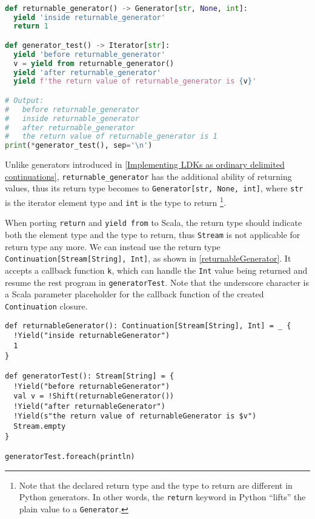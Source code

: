 \begin{lstlisting}[language=Python,style=Python3,caption={Use \lstinline{yield from} and \lstinline{return} in Python generators},label={returnable_generator}]

def returnable_generator() -> Generator[str, None, int]:
  yield 'inside returnable_generator'
  return 1

def generator_test() -> Iterator[str]:
  yield 'before returnable_generator'
  v = yield from returnable_generator()
  yield 'after returnable_generator'
  yield f'the return value of returnable_generator is {v}'

# Output:
#   before returnable_generator
#   inside returnable_generator
#   after returnable_generator
#   the return value of returnable_generator is 1
print(*generator_test(), sep='\n')
\end{lstlisting}

Unlike generators introduced in \cref{Implementing LDKs as ordinary delimited continuations}, \lstinline{returnable_generator} has the additional ability of returning values, thus its return type becomes to \lstinline{Generator[str, None, int]}, where \lstinline{str} is the iterator element type and \lstinline{int} is the type to return \footnote{Note that the declared return type and the type to return are different in Python generators. In other words, the \lstinline{return} keyword in Python ``lifts'' the plain value to a \lstinline{Generator}.}.

When porting \lstinline{return} and \lstinline{yield from} to Scala, the return type should indicate both the element type and the type to return, thus \lstinline{Stream} is not applicable for return type any more. We can instead use the return type \lstinline{Continuation[Stream[String], Int]}, as shown in \cref{returnableGenerator}. It accepts a callback function \lstinline{k}, which can handle the \lstinline{Int} value being returned and resume the rest program in \lstinline{generatorTest}. Note that the underscore character is a Scala parameter placeholder for the callback function of the created \lstinline{Continuation} closure.

\begin{lstlisting}[caption={Returning an additional value in LDK-based generators},label={returnableGenerator}]
def returnableGenerator(): Continuation[Stream[String], Int] = _ {
  !Yield("inside returnableGenerator")
  1
}

def generatorTest(): Stream[String] = {
  !Yield("before returnableGenerator")
  val v = !Shift(returnableGenerator())
  !Yield("after returnableGenerator")
  !Yield(s"the return value of returnableGenerator is $v")
  Stream.empty
}

generatorTest.foreach(println)
\end{lstlisting}

